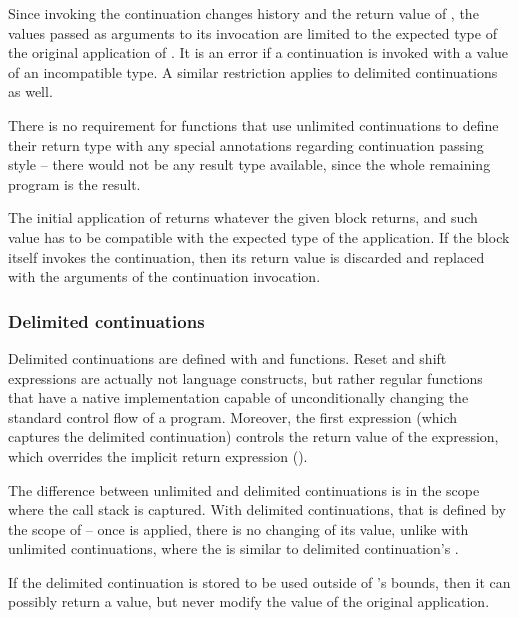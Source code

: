 Since invoking the continuation changes history and the return value of , the values passed as arguments to its invocation are limited to the expected type of the original application of . It is an error if a continuation is invoked with a value of an incompatible type. A similar restriction applies to delimited continuations as well. 

There is no requirement for functions that use unlimited continuations to define their return type with any special annotations regarding continuation passing style -- there would not be any result type available, since the whole remaining program is the result. 

The initial application of  returns whatever the given block returns, and such value has to be compatible with the expected type of the  application. If the block itself invokes the continuation, then its return value is discarded and replaced with the arguments of the continuation invocation. 







\subsubsection{Delimited continuations}

Delimited continuations are defined with  and  functions. Reset and shift expressions are actually not language constructs, but rather regular functions that have a native implementation capable of unconditionally changing the standard control flow of a program. Moreover, the first  expression (which captures the delimited continuation) controls the return value of the  expression, which overrides the implicit return expression ().

The difference between unlimited and delimited continuations is in the scope where the call stack is captured. With delimited continuations, that is defined by the scope of  -- once  is applied, there is no changing of its value, unlike with unlimited continuations, where the  is similar to delimited continuation's . 

If the delimited continuation is stored to be used outside of 's bounds, then it can possibly return a value, but never modify the value of the original  application.

